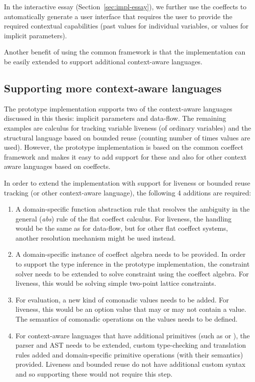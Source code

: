 In the interactive essay (Section~\ref{sec:impl-essay}), we further use the coeffects to
automatically generate a user interface that requires the user to provide the required contextual
capabilities (past values for individual variables, or values for implicit parameters).

Another benefit of using the common framework is that the implementation can be easily extended
to support additional context-aware languages.


\subsection{Supporting more context-aware languages}
\label{sec:impl-theory-ext}

The prototype implementation supports two of the context-aware languages discussed in this thesis:
implicit parameters and data-flow. The remaining examples are calculus for tracking variable
liveness (of ordinary variables) and the structural language based on bounded reuse (counting
number of times values are used). However, the prototype implementation is based on the
common coeffect framework and makes it easy to add support for these and also for other context
aware languages based on coeffects.

In order to extend the implementation with support for liveness or bounded reuse tracking (or
other context-aware language), the following 4 additions are required:

\begin{enumerate}
\item A domain-specific function abstraction rule that resolves the ambiguity in the general
  (\emph{abs}) rule of the flat coeffect calculus. For liveness, the handling would be the same
  as for data-flow, but for other flat coeffect systems, another resolution mechanism might be used
  instead.

\item A domain-specific instance of coeffect algebra needs to be provided. In order to support
  the type inference in the prototype implementation, the constraint solver needs to be extended
  to solve constraint using the coeffect algebra. For liveness, this would be solving simple
  two-point lattice constraints.

\item For evaluation, a new kind of comonadic values needs to be added. For liveness, this would be
  an option value that may or may not contain a value. The semantics of comonadic operations on the
  values needs to be defined.

\item For context-aware languages that have additional primitives (such as  or ),
  the parser and AST needs to be extended, custom type-checking and translation rules added and
  domain-specific primitive operations (with their semantics) provided. Liveness and bounded reuse
  do not have additional custom syntax and so supporting these would not require this step.
\end{enumerate}

